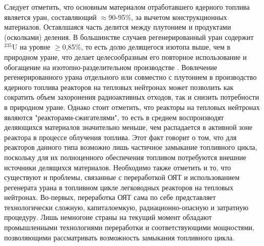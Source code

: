 Следует отметить, что основным материалом отработавшего ядерного топлива является уран, составляющий $\approx$90-95\%, за вычетом конструкционных материалов. Оставлшаяся часть делится между плутонием и продуктами (осколками) деления. В большинстве случаев регенерированный уран содержит $^{235}$U на уровне $\geq$0,85\%, то есть долю делящегося изотопа выше, чем в природном уране, что делает целесообразным его повторное использование и обогащение на изотопно-разделительном производстве  \cite{NikipelovNikipelovSudby}. Вовлечение регенерированного урана отдельного или совместно с плутонием в производство ядерного топлива реакторов на тепловых нейтронах может позволить как сократить объем захоронения радиоактивных отходов, так и снизить потребности в природном уране. Однако стоит отметить, что реакторы на тепловых нейтронах являются "реакторами-сжигателями", то есть в среднем воспроизводят деляющихся материалов значительно меньше, чем распадается в активной зоне реактора в процессе облучения топлива. Этот факт говорит о том, что для реакторов данного типа возможно лишь частичное замыкание топливного цикла, поскольку для их полноценного обеспечения топливом потребуются внешние источники делящихся материалов.  
Необходимо также отметить и то, что существуют и проблемы, связанные с переработкой ОЯТ и использованием регенерата урана в топливном цикле легководных реакторов на тепловых нейтронах.
Во-первых, переработка ОЯТ сама по себе представляет технологически сложную, капиталоемкую, радиационно-опасную и затратную процедуру. Лишь немногоие страны на текущий момент обладают промышленными технологиями переработки и соответствующими мощностями, позволяющими рассматривать возможность замыкания топливного цикла.
